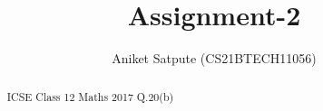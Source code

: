 \documentclass[journal,12pt,twocolumn]{IEEEtran}
\begin{document}
\newtheorem{theorem}{Theorem}[section]
\newtheorem{problem}{Problem}
\newtheorem{proposition}{Proposition}[section]
\newtheorem{lemma}{Lemma}[section]
\newtheorem{corollary}[theorem]{Corollary}
\newtheorem{example}{Example}[section]
\newtheorem{definition}[problem]{Definition}
\newcommand{\BEQA}{\begin{eqnarray}}
\newcommand{\EEQA}{\end{eqnarray}}
\newcommand{\define}{\stackrel{\triangle}{=}}
\newcommand*\circled[1]{\tikz[baseline=(char.base)]{
\node[shape=circle,draw,inner sep=2pt] (char) {#1};}}

\providecommand{\mbf}{\mathbf}
\providecommand{\pr}[1]{\ensuremath{\Pr\left(#1\right)}}
\providecommand{\qfunc}[1]{\ensuremath{Q\left(#1\right)}}
\providecommand{\sbrak}[1]{\ensuremath{{}\left[#1\right]}}
\providecommand{\lsbrak}[1]{\ensuremath{{}\left[#1\right.}}
\providecommand{\rsbrak}[1]{\ensuremath{{}\left.#1\right]}}
\providecommand{\brak}[1]{\ensuremath{\left(#1\right)}}
\providecommand{\lbrak}[1]{\ensuremath{\left(#1\right.}}
\providecommand{\rbrak}[1]{\ensuremath{\left.#1\right)}}
\providecommand{\cbrak}[1]{\ensuremath{\left\{#1\right\}}}
\providecommand{\lcbrak}[1]{\ensuremath{\left\{#1\right.}}
\providecommand{\rcbrak}[1]{\ensuremath{\left.#1\right\}}}
\theoremstyle{remark}
\newtheorem{rem}{Remark}
\newcommand{\sgn}{\mathop{\mathrm{sgn}}}
\providecommand{\fourier}{\overset{\mathcal{F}}{ \rightleftharpoons}}
\providecommand{\system}{\overset{\mathcal{H}}{ \longleftrightarrow}}
\newcommand{\solution}{\noindent \textbf{Solution: }}
\newcommand{\cosec}{\,\text{cosec}\,}
\providecommand{\dec}[2]{\ensuremath{\overset{#1}{\underset{#2}{\gtrless}}}}
\newcommand{\myvec}[1]{\ensuremath{\begin{pmatrix}#1\end{pmatrix}}}
\newcommand{\mydet}[1]{\ensuremath{\begin{vmatrix}#1\end{vmatrix}}}
\makeatletter
{}
\makeatother
\let\StandardTheFigure\thefigure
\let\vec\mathbf
\def\putbox#1#2#3{\makebox[0in][l]{\makebox[#1][l]{}\raisebox{\baselineskip}[0in][0in]{\raisebox{#2}[0in][0in]{#3}}}}
\def\rightbox#1{\makebox[0in][r]{#1}}
\def\centbox#1{\makebox[0in]{#1}}
\def\topbox#1{\raisebox{-\baselineskip}[0in][0in]{#1}}
\def\midbox#1{\raisebox{-0.5\baselineskip}[0in][0in]{#1}}
\title{Assignment-2}
\author{ Aniket Satpute (CS21BTECH11056)}
\graphicspath{{figure/}}
\maketitle
\begin{abstract}
ICSE Class 12 Maths 2017 Q.20(b)
\end{abstract}
\end{document}

